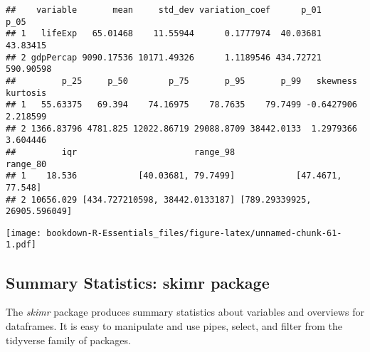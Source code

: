 \documentclass[]{book}
\newenvironment{Shaded}{\begin{snugshade}}{\end{snugshade}}
\newcommand{\KeywordTok}[1]{\textcolor[rgb]{0.13,0.29,0.53}{\textbf{#1}}}
\newcommand{\DecValTok}[1]{\textcolor[rgb]{0.00,0.00,0.81}{#1}}
\newcommand{\StringTok}[1]{\textcolor[rgb]{0.31,0.60,0.02}{#1}}
\newcommand{\CommentTok}[1]{\textcolor[rgb]{0.56,0.35,0.01}{\textit{#1}}}
\newcommand{\OperatorTok}[1]{\textcolor[rgb]{0.81,0.36,0.00}{\textbf{#1}}}
\newcommand{\NormalTok}[1]{#1}
\begin{document}
\begin{Shaded}
\end{Shaded}

\begin{verbatim}
##    variable       mean     std_dev variation_coef      p_01      p_05
## 1   lifeExp   65.01468    11.55944      0.1777974  40.03681  43.83415
## 2 gdpPercap 9090.17536 10171.49326      1.1189546 434.72721 590.90598
##         p_25     p_50        p_75       p_95       p_99   skewness kurtosis
## 1   55.63375   69.394    74.16975    78.7635    79.7499 -0.6427906 2.218599
## 2 1366.83796 4781.825 12022.86719 29088.8709 38442.0133  1.2979366 3.604446
##         iqr                       range_98                     range_80
## 1    18.536            [40.03681, 79.7499]            [47.4671, 77.548]
## 2 10656.029 [434.727210598, 38442.0133187] [789.29339925, 26905.596049]
\end{verbatim}

\begin{Shaded}
\end{Shaded}

\texttt{[image: bookdown-R-Essentials\_files/figure-latex/unnamed-chunk-61-1.pdf]}

\subsection{Summary Statistics: skimr
package}\label{summary-statistics-skimr-package}

The \emph{skimr} package produces summary statistics about variables and
overviews for dataframes. It is easy to manipulate and use pipes,
select, and filter from the tidyverse family of packages.
\end{document}
